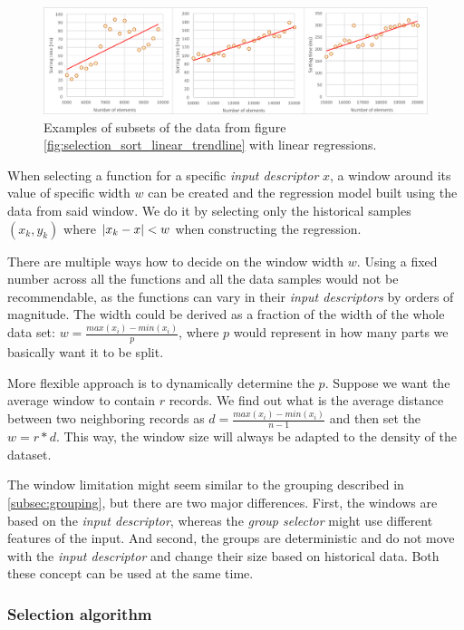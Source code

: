 \begin{figure}[h!]
	\captionsetup{justification=centering,margin=0.5cm}
	\centerline{\mbox{\includegraphics[width=150mm]{./img/window_examples.png}}}
	\caption{Examples of subsets of the data from figure \ref{fig:selection_sort_linear_trendline} with linear regressions.}
	\label{fig:window_examples}
\end{figure}

When selecting a function for a specific \textit{input descriptor} $x$, a window around its value of specific width $w$ can be created and the regression model built using the data from said window. We do it by selecting only the historical samples $(x_k, y_k)$ where $\left|{x_k - x}\right| < w$ when constructing the regression.

There are multiple ways how to decide on the window width $w$. Using a fixed number across all the functions and all the data samples would not be recommendable, as the functions can vary in their \textit{input descriptors} by orders of magnitude. The width could be derived as a fraction of the width of the whole data set: $w = \frac{max(x_i) - min(x_i)}{p}$, where $p$ would represent in how many parts we basically want it to be split. 

More flexible approach is to dynamically determine the $p$. Suppose we want the average window to contain $r$ records. We find out what is the average distance between two neighboring records as $d =  \frac{max(x_i) - min(x_i)}{n - 1}$ and then set the $w = r * d$. This way, the window size will always be adapted to the density of the dataset.

The window limitation might seem similar to the grouping described in \ref{subsec:grouping}, but there are two major differences. First, the windows are based on the \textit{input descriptor}, whereas the \textit{group selector} might use different features of the input. And second, the groups are deterministic and do not move with the \textit{input descriptor} and change their size based on historical data. Both these concept can be used at the same time.

\subsubsection{Selection algorithm}

